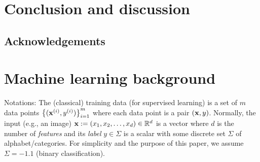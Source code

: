 \documentclass[
10pt,
aps,
pra,
linenumbers,
floatfix,
]{revtex4-2}
\theoremstyle{plain}
\theoremstyle{definition}
\begin{document}
\section{Conclusion and discussion}

\subsection*{Acknowledgements}



%


\onecolumngrid
\appendix

\section{Machine learning background}


Notations:
The (classical) training data (for supervised learning) is a set of $m$ data points $\qty{(\vb{x}^{(i)}, y^{(i)})}^{m}_{i=1}$ 
where each data point is a pair $(\vb{x},y)$.
Normally, the input (e.g., an image) $\vb{x}:= (x_1,x_2,\dots,x_d) \in \mathbb{R}^d$  is a vector where $d$ is the number of \emph{features}
and its \emph{label} $y\in\Sigma$ is a scalar with some discrete set $\Sigma$ of alphabet/categories. 
For simplicity and the purpose of this paper, we assume $\Sigma=\qty{-1,1}$ (binary classification).
\end{document}
